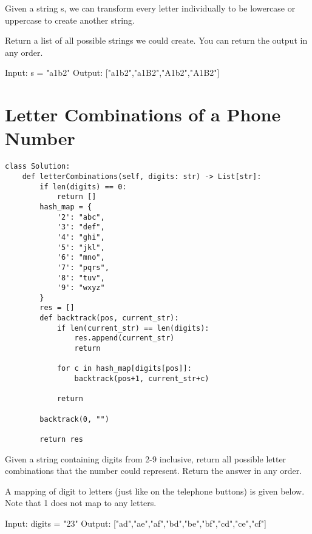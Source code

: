 \documentclass[a4]{article}
\begin{document}
Given a string s, we can transform every letter individually to be lowercase or uppercase to create another string.

Return a list of all possible strings we could create. You can return the output in any order.

Input: s = "a1b2"
Output: ["a1b2","a1B2","A1b2","A1B2"]

\newpage
\section{Letter Combinations of a Phone Number}
\begin{lstlisting}
class Solution:
    def letterCombinations(self, digits: str) -> List[str]:
        if len(digits) == 0:
            return []
        hash_map = {
            '2': "abc",
            '3': "def",
            '4': "ghi",
            '5': "jkl",
            '6': "mno",
            '7': "pqrs",
            '8': "tuv",
            '9': "wxyz"
        }
        res = []
        def backtrack(pos, current_str):
            if len(current_str) == len(digits):
                res.append(current_str)
                return
            
            for c in hash_map[digits[pos]]:
                backtrack(pos+1, current_str+c)
            
            return
        
        backtrack(0, "")
        
        return res
\end{lstlisting}

Given a string containing digits from 2-9 inclusive, return all possible letter combinations that the number could represent. Return the answer in any order.

A mapping of digit to letters (just like on the telephone buttons) is given below. Note that 1 does not map to any letters.

Input: digits = "23"
Output: ["ad","ae","af","bd","be","bf","cd","ce","cf"]

\newpage
\section{}
\end{document}
